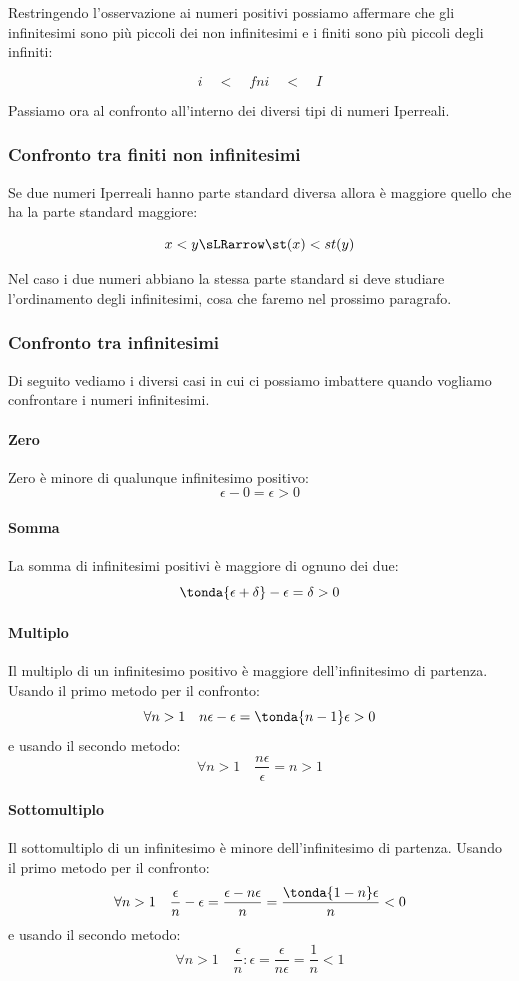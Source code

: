 Restringendo l'osservazione ai numeri positivi possiamo affermare che gli 
infinitesimi sono più piccoli dei non infinitesimi e i finiti sono più 
piccoli degli infiniti:

\[i \quad < \quad fni \quad < \quad I\]

Passiamo ora al confronto all'interno dei diversi tipi di numeri Iperreali.

\subsubsection{Confronto tra finiti non infinitesimi}
\label{subsubsec:insnum_confrontoreali}

Se due numeri Iperreali hanno parte standard diversa allora è maggiore 
quello 
che ha la parte standard maggiore:

\[x < y \sLRarrow \st(x) < st(y)\]

Nel caso i due numeri abbiano la stessa parte standard si deve studiare 
l'ordinamento degli infinitesimi, cosa che faremo nel prossimo paragrafo.

\subsubsection{Confronto tra infinitesimi}
\label{subsubsec:insnum_confrontoreali}

Di seguito vediamo i diversi casi in cui ci possiamo 
imbattere quando vogliamo confrontare i numeri infinitesimi.

\paragraph{Zero}
Zero è minore di qualunque infinitesimo positivo:
\[\epsilon-0 = \epsilon>0\]
\paragraph{Somma}
La somma di infinitesimi positivi è maggiore di ognuno dei due:
\[\tonda{\epsilon+\delta}-\epsilon = \delta > 0\]
\paragraph{Multiplo}
Il multiplo di un infinitesimo positivo è maggiore dell'infinitesimo di 
partenza. Usando il primo metodo per il confronto:
\[\forall n > 1 \quad n\epsilon-\epsilon = \tonda{n-1}\epsilon > 0\]
e usando il secondo metodo: 
\[\forall n > 1 \quad \frac{n\epsilon}{\epsilon} = n > 1\]
\paragraph{Sottomultiplo}
Il sottomultiplo di un infinitesimo è minore dell'infinitesimo di partenza. 
Usando il primo metodo per il confronto:
\[\forall n > 1 \quad \frac{\epsilon}{n}-\epsilon = 
                      \frac{\epsilon-n\epsilon}{n} = 
                      \frac{\tonda{1-n}\epsilon}{n} < 0\]
e usando il secondo metodo: 
\[\forall n > 1 \quad \frac{\epsilon}{n}:\epsilon =
                      \frac{\epsilon}{n\epsilon} =
                      \frac{1}{n} < 1\]

